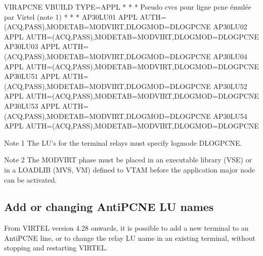 \documentclass[letterpaper,10pt,english]{sphinxmanual}
\begin{document}
\begin{sphinxVerbatim}[commandchars=\\\{\}]
VIRAPCNE VBUILD TYPE=APPL
* \PYGZhy{}\PYGZhy{}\PYGZhy{}\PYGZhy{}\PYGZhy{}\PYGZhy{}\PYGZhy{}\PYGZhy{}\PYGZhy{}\PYGZhy{}\PYGZhy{}\PYGZhy{}\PYGZhy{}\PYGZhy{}\PYGZhy{}\PYGZhy{}\PYGZhy{}\PYGZhy{}\PYGZhy{}\PYGZhy{}\PYGZhy{}\PYGZhy{}\PYGZhy{}\PYGZhy{}\PYGZhy{}\PYGZhy{}\PYGZhy{}\PYGZhy{}\PYGZhy{}\PYGZhy{}\PYGZhy{}\PYGZhy{}\PYGZhy{}\PYGZhy{}\PYGZhy{}\PYGZhy{}\PYGZhy{}\PYGZhy{}\PYGZhy{}\PYGZhy{}\PYGZhy{}\PYGZhy{}\PYGZhy{}\PYGZhy{}\PYGZhy{}\PYGZhy{}\PYGZhy{}\PYGZhy{}\PYGZhy{}\PYGZhy{}\PYGZhy{}\PYGZhy{}\PYGZhy{}\PYGZhy{}\PYGZhy{}\PYGZhy{}\PYGZhy{}\PYGZhy{}\PYGZhy{}\PYGZhy{}\PYGZhy{}\PYGZhy{}\PYGZhy{}\PYGZhy{}\PYGZhy{}\PYGZhy{} *
* Pseudo cvcs pour ligne pcne émulée par Virtel (note 1) *
* \PYGZhy{}\PYGZhy{}\PYGZhy{}\PYGZhy{}\PYGZhy{}\PYGZhy{}\PYGZhy{}\PYGZhy{}\PYGZhy{}\PYGZhy{}\PYGZhy{}\PYGZhy{}\PYGZhy{}\PYGZhy{}\PYGZhy{}\PYGZhy{}\PYGZhy{}\PYGZhy{}\PYGZhy{}\PYGZhy{}\PYGZhy{}\PYGZhy{}\PYGZhy{}\PYGZhy{}\PYGZhy{}\PYGZhy{}\PYGZhy{}\PYGZhy{}\PYGZhy{}\PYGZhy{}\PYGZhy{}\PYGZhy{}\PYGZhy{}\PYGZhy{}\PYGZhy{}\PYGZhy{}\PYGZhy{}\PYGZhy{}\PYGZhy{}\PYGZhy{}\PYGZhy{}\PYGZhy{}\PYGZhy{}\PYGZhy{}\PYGZhy{}\PYGZhy{}\PYGZhy{}\PYGZhy{}\PYGZhy{}\PYGZhy{}\PYGZhy{}\PYGZhy{}\PYGZhy{}\PYGZhy{}\PYGZhy{}\PYGZhy{}\PYGZhy{}\PYGZhy{}\PYGZhy{}\PYGZhy{}\PYGZhy{}\PYGZhy{}\PYGZhy{}\PYGZhy{}\PYGZhy{}\PYGZhy{} *
AP30LU01 APPL AUTH=(ACQ,PASS),MODETAB=MODVIRT,DLOGMOD=DLOGPCNE
AP30LU02 APPL AUTH=(ACQ,PASS),MODETAB=MODVIRT,DLOGMOD=DLOGPCNE
AP30LU03 APPL AUTH=(ACQ,PASS),MODETAB=MODVIRT,DLOGMOD=DLOGPCNE
AP30LU04 APPL AUTH=(ACQ,PASS),MODETAB=MODVIRT,DLOGMOD=DLOGPCNE
AP30LU51 APPL AUTH=(ACQ,PASS),MODETAB=MODVIRT,DLOGMOD=DLOGPCNE
AP30LU52 APPL AUTH=(ACQ,PASS),MODETAB=MODVIRT,DLOGMOD=DLOGPCNE
AP30LU53 APPL AUTH=(ACQ,PASS),MODETAB=MODVIRT,DLOGMOD=DLOGPCNE
AP30LU54 APPL AUTH=(ACQ,PASS),MODETAB=MODVIRT,DLOGMOD=DLOGPCNE

Note 1
    The LU’s for the terminal relays must specify logmode DLOGPCNE.

Note 2
    The MODVIRT phase must be placed in an executable library (VSE) or in a LOADLIB (MVS, VM) defined to VTAM before the application major node can be activated.
\end{sphinxVerbatim}


\subsection{Add or changing AntiPCNE LU names}
\label{\detokenize{connectivity_guide:add-or-changing-antipcne-lu-names}}\label{\detokenize{connectivity_guide:index-86}}
From VIRTEL version 4.28 onwards, it is possible to add a new terminal to an AntiPCNE line, or to change the relay LU name in an existing terminal, without stopping and restarting VIRTEL.
\end{document}
